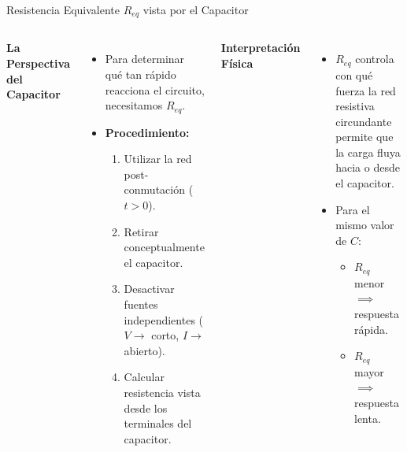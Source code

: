 \documentclass[aspectratio=169, 10pt]{beamer}
\begin{document}
\begin{frame}{Resistencia Equivalente $R_{eq}$ vista por el Capacitor}
    \begin{columns}[T]
        \textbf{La Perspectiva del Capacitor}
        \begin{itemize}
            \item Para determinar qué tan rápido reacciona el circuito, necesitamos $R_{eq}$.
            \item \textbf{Procedimiento:}
            \begin{enumerate}
                \item Utilizar la red post-conmutación ($t > 0$).
                \item Retirar conceptualmente el capacitor.
                \item Desactivar fuentes independientes ($V \to$ corto, $I \to$ abierto).
                \item Calcular resistencia vista desde los terminales del capacitor.
            \end{enumerate}
        \end{itemize}
        
        \textbf{Interpretación Física}
        \begin{itemize}
            \item $R_{eq}$ controla con qué fuerza la red resistiva circundante permite que la carga fluya hacia o desde el capacitor.
            \item Para el mismo valor de $C$:
            \begin{itemize}
                \item $R_{eq}$ menor $\implies$ respuesta rápida.
                \item $R_{eq}$ mayor $\implies$ respuesta lenta.
            \end{itemize}
        \end{itemize}
    \end{columns}
\end{frame}
\end{document}
